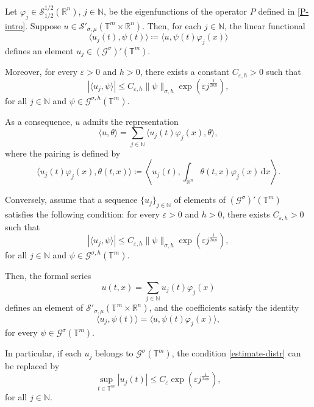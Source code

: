\documentclass[12pt,reqno]{amsart}
\theoremstyle{definition}
\numberwithin{equation}{section}
\begin{document}
Let \(\varphi_j \in \mathcal{S}_{1/2}^{1/2}(\mathbb{R}^n)\), \(j \in \mathbb{N}\), be the eigenfunctions of the operator $P$ defined in \eqref{P-intro}. Suppose $u \in \mathcal{S}'_{\sigma, \mu}(\mathbb{T}^m \times \mathbb{R}^n)$. Then, for each $j \in \mathbb{N}$, the linear functional
\begin{equation*}
	\langle u_j(t), \psi(t) \rangle \coloneqq \langle u, \psi(t)\varphi_j(x) \rangle
\end{equation*}
defines an element $u_j \in (\mathcal{G}^\sigma)'(\mathbb{T}^m)$.

Moreover, for every $\varepsilon > 0$ and $h > 0$, there exists a constant $C_{\varepsilon,h} > 0$ such that
\begin{equation*}
	|\langle u_j, \psi \rangle| \leq C_{\varepsilon,h} \| \psi \|_{\sigma, h} \exp\left( \varepsilon j^{\frac{1}{2n\mu}} \right),
\end{equation*}
for all $j \in \mathbb{N}$ and $\psi \in \mathcal{G}^{\sigma,h}(\mathbb{T}^m)$.

As a consequence, $u$ admits the representation
\[
\langle u, \theta \rangle = \sum_{j \in \mathbb{N}} \langle u_j(t)\varphi_j(x), \theta \rangle,
\]
where the pairing is defined by
\[
\langle u_j(t)\varphi_j(x), \theta(t,x) \rangle \coloneqq 
\left\langle u_j(t), \int_{\mathbb{R}^n} \theta(t,x)\varphi_j(x) \, \mathrm{d}x \right\rangle.
\]

Conversely, assume that a sequence $\{u_j\}_{j \in \mathbb{N}}$ of elements of
$(\mathcal{G}^\sigma)'(\mathbb{T}^m)$ satisfies the following condition:
for every $\varepsilon > 0$ and $h > 0$, there exists $C_{\varepsilon,h} > 0$
such that
\begin{equation}\label{estimate-distr}
	|\langle u_j, \psi \rangle| \leq C_{\varepsilon,h} \| \psi \|_{\sigma,h}
	\exp\left( \varepsilon j^{\frac{1}{2n\mu}} \right),
\end{equation}
for all $j \in \mathbb{N}$ and $\psi \in \mathcal{G}^{\sigma,h}(\mathbb{T}^m)$.

Then, the formal series
\[
u(t,x) = \sum_{j \in \mathbb{N}} u_j(t)\varphi_j(x)
\]
defines an element of $\mathcal{S}'_{\sigma,\mu}(\mathbb{T}^m \times \mathbb{R}^n)$, and the coefficients satisfy the identity
\[
\langle u_j, \psi(t) \rangle = \langle u, \psi(t)\varphi_j(x) \rangle,
\]
for every \( \psi \in \mathcal{G}^\sigma(\mathbb{T}^m).\)

In particular, if each $u_j$ belongs to $\mathcal{G}^\sigma(\mathbb{T}^m)$, the condition \eqref{estimate-distr} can be replaced by
\begin{equation*}
	\sup_{t \in \mathbb{T}^m} |u_j(t)| \leq C_\varepsilon \exp\left( \varepsilon j^{\frac{1}{2n\mu}} \right),
\end{equation*}
for all \(j \in \mathbb{N}.\)
\end{document}

